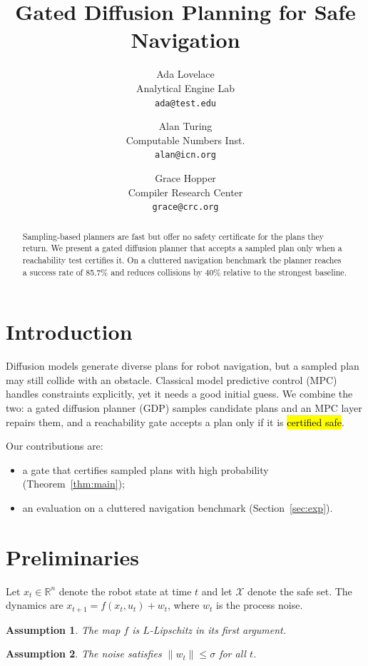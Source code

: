 \documentclass[letterpaper,10pt]{article}
\title{Gated Diffusion Planning for Safe Navigation}
\author{Ada Lovelace\\Analytical Engine Lab\\\texttt{ada@test.edu}
  \and Alan Turing\\Computable Numbers Inst.\\\texttt{alan@icn.org}
  \and Grace Hopper\\Compiler Research Center\\\texttt{grace@crc.org}}
\newtheorem{assumption}{Assumption}
\begin{document}
\maketitle

\begin{abstract}
Sampling-based planners are fast but offer no safety certificate for the plans they return.
We present a gated diffusion planner that accepts a sampled plan only when a reachability test
certifies it. On a cluttered navigation benchmark the planner reaches a success rate of
85.7\% and reduces collisions by 40\% relative to the strongest baseline.
\end{abstract}

\section{Introduction}\label{sec:intro}
Diffusion models generate diverse plans for robot navigation, but a sampled plan may still
collide with an obstacle. Classical model predictive control (MPC) handles constraints
explicitly, yet it needs a good initial guess. We combine the two: a gated diffusion planner
(GDP) samples candidate plans and an MPC layer repairs them, and a reachability gate accepts
a plan only if it is \hl{certified safe}.

Our contributions are:
\begin{itemize}
  \item a gate that certifies sampled plans with high probability (Theorem~\ref{thm:main});
  \item an evaluation on a cluttered navigation benchmark (Section~\ref{sec:exp}).
\end{itemize}

\section{Preliminaries}\label{sec:prelim}
Let $x_t \in \mathbb{R}^n$ denote the robot state at time $t$ and let $\mathcal{X}$ denote the
safe set. The dynamics are $x_{t+1} = f(x_t, u_t) + w_t$, where $w_t$ is the process noise.

\begin{assumption}\label{asm:lip}
The map $f$ is $L$-Lipschitz in its first argument.
\end{assumption}

\begin{assumption}\label{asm:noise}
The noise satisfies $\|w_t\| \le \sigma$ for all $t$.
\end{assumption}
\end{document}
